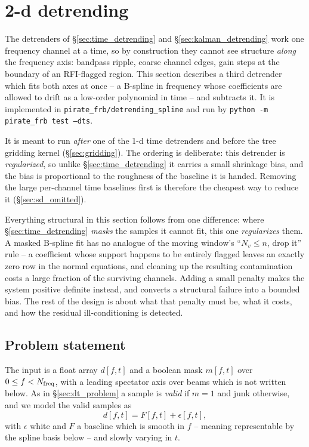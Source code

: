\documentclass{article}
\numberwithin{equation}{section}   %
\begin{document}
\clearpage

\section{2-d detrending}
\label{sec:detrending_2d}

The detrenders of \S\ref{sec:time_detrending} and \S\ref{sec:kalman_detrending} work one frequency channel at
a time, so by construction they cannot see structure {\em along} the frequency axis: bandpass ripple, coarse
channel edges, gain steps at the boundary of an RFI-flagged region.  This section describes a third detrender
which fits both axes at once -- a B-spline in frequency whose coefficients are allowed to drift as a low-order
polynomial in time -- and subtracts it.  It is implemented in {\tt pirate\_frb/detrending\_spline} and run by
{\tt python -m pirate\_frb test --dts}.

It is meant to run {\em after} one of the 1-d time detrenders and before the tree gridding kernel
(\S\ref{sec:gridding}).  The ordering is deliberate: this detrender is {\em regularized}, so unlike
\S\ref{sec:time_detrending} it carries a small shrinkage bias, and the bias is proportional to the roughness of
the baseline it is handed.  Removing the large per-channel time baselines first is therefore the cheapest way
to reduce it (\S\ref{sec:sd_omitted}).

Everything structural in this section follows from one difference: where \S\ref{sec:time_detrending}
{\em masks} the samples it cannot fit, this one {\em regularizes} them.  A masked B-spline fit has no analogue
of the moving window's ``$N_v \le n$, drop it'' rule -- a coefficient whose support happens to be entirely
flagged leaves an exactly zero row in the normal equations, and cleaning up the resulting contamination costs a
large fraction of the surviving channels.  Adding a small penalty makes the system positive definite instead,
and converts a structural failure into a bounded bias.  The rest of the design is about what that penalty must
be, what it costs, and how the residual ill-conditioning is detected.

\subsection{Problem statement}
\label{sec:sd_problem}

The input is a float array $d[f,t]$ and a boolean mask $m[f,t]$ over $0 \le f < N_{\rm freq}$, with a leading
spectator axis over beams which is not written below.  As in \S\ref{sec:dt_problem} a sample is {\em valid} if
$m=1$ and junk otherwise, and we model the valid samples as
\begin{equation}
d[f,t] = F[f,t] + \epsilon[f,t],
\end{equation}
with $\epsilon$ white and $F$ a baseline which is smooth in $f$ -- meaning representable by the spline basis
below -- and slowly varying in $t$.
\end{document}
